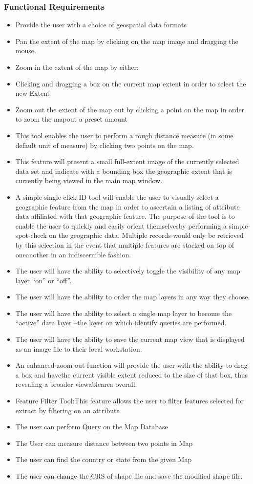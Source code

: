 \subsubsection{Functional Requirements}
\begin{itemize}
\item Provide the user with a choice of geospatial data formats
\item Pan the extent of the map by clicking on the map image and dragging the mouse.
\item Zoom in the extent of the map by either:
\item Clicking and dragging a box on the current map extent in order to select the new Extent
\item Zoom out the extent of the map out by clicking a point on the map in order to zoom the mapout a preset amount
\item This tool enables the user to perform a rough distance measure (in some default unit of measure) by clicking two points on the map.
\item This feature will present a small full-extent image of the currently selected data set and indicate with a bounding box the geographic extent that is currently being viewed in the main map window.
\item A simple single-click ID tool will enable the user to visually select a geographic feature from the map in order to ascertain a listing of attribute data affiliated with that geographic feature. The purpose of the tool is to enable the user to quickly and easily orient themselvesby performing a simple spot-check on the geographic data. Multiple records would only be retrieved by this selection in the event that multiple features are stacked on top of oneanother in an indiscernible fashion.
\item The user will have the ability to selectively toggle the visibility of any map layer “on” or “off”.
\item The user will have the ability to order the map layers in any way they choose.
\item The user will have the ability to select a single map layer to become the “active” data layer –the layer on which identify queries are performed.
\item The user will have the ability to save the current map view that is displayed as an image file to their local workstation.
\item An enhanced zoom out function will provide the user with the ability to drag a box and havethe current visible extent reduced to the size of that box, thus revealing a broader viewablearea overall.
\item Feature Filter Tool:This feature allows the user to filter features selected for extract by filtering on an attribute
\item The user can perform Query on the Map Database
\item The User can measure distance between two points in Map
\item The user can find the country or state from the given Map
\item The user can change the CRS of shape file and save the modified shape file.
\end{itemize}

